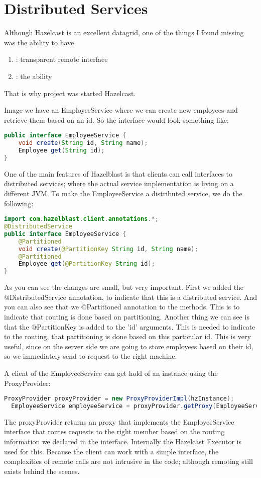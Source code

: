 \chapter{Distributed Services}
Although Hazelcast is an excellent datagrid, one of the things I found missing was the ability to have 
\begin{enumerate}
\item: transparent remote interface
\item: the ability 
\end{enumerate}

That is why project was started Hazelcast.

Image we have an EmployeeService where we can create new employees and retrieve them based on an id. So the interface would look something like:
\begin{lstlisting}[language=java]
public interface EmployeeService {
    void create(String id, String name);
    Employee get(String id);
}
\end{lstlisting}
One of the main features of Hazelblast is that clients can call interfaces to distributed services; where the actual service implementation is living on a different JVM. To make the EmployeeService a distributed service, we do the following: 
\begin{lstlisting}[language=java]
import com.hazelblast.client.annotations.*;
@DistributedService
public interface EmployeeService {
    @Partitioned
    void create(@PartitionKey String id, String name);
    @Partitioned
    Employee get(@PartitionKey String id);
}
\end{lstlisting}
As you can see the changes are small, but very important. First we added the @DistributedService annotation, to indicate that this is a distributed service. And you can also see that we @Partitioned annotation to the methods. This is to indicate that routing is done based on partitioning. Another thing we can see is that the @PartitionKey is added to the 'id' arguments. This is needed to indicate to the routing, that partitioning is done based on this particular id. This is very useful, since on the server side we are going to store employees based on their id, so we immediately send to request to the right machine. 

A client of the EmployeeService can get hold of an instance using the ProxyProvider:
\begin{lstlisting}[language=java]
  ProxyProvider proxyProvider = new ProxyProviderImpl(hzInstance);
  EmployeeService employeeService = proxyProvider.getProxy(EmployeeService.class);
\end{lstlisting}
The proxyProvider returns an proxy that implements the EmployeeService interface that routes requests to the right member based on the routing information we declared in the interface. Internally the Hazelcast Executor is used for this. Because the client can work with a simple interface, the complexities of remote calls are not intrusive in the code; although remoting still exists behind the scenes.

